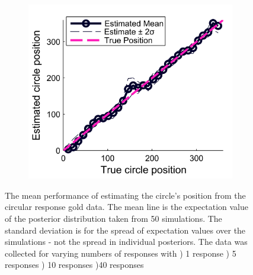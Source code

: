 \begin{figure}
\begin{subfigure}{7cm}
	\includegraphics[scale=1]{line_circular_fusion_mean_40_gold.png}
	\caption{}	
	\label{Figure: circular_fusion_mean_40_gold}
	\end{subfigure}
	\label{Figure: circular_fusion_mean_gold}
	\caption{The mean performance of estimating the circle's position from the circular response gold data. The mean line is the expectation value of the posterior distribution taken from 50 simulations. The standard deviation is for the spread of expectation values over the simulations - not the spread in individual posteriors. The data was collected for varying numbers of responses with ) 1 response ) 5 responses ) 10 responses )40 responses}
\end{figure}